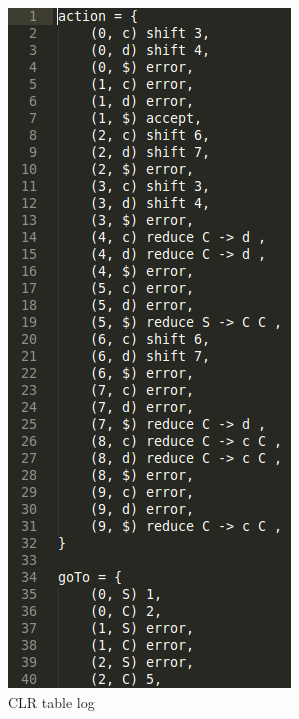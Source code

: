 \documentclass{beamer}
\begin{document}
\begin{frame}
\begin{figure}
\begin{subfigure}[b]{0.3\textwidth}
        \includegraphics[height=0.8\textheight]{LogCLRTable.png}
        \caption{CLR table log}
        \label{fig:clrtable}
    \end{subfigure}
    ~ %
    \begin{subfigure}[b]{0.3\textwidth}

\end{subfigure}
\end{figure}
\end{frame}
\end{document}
